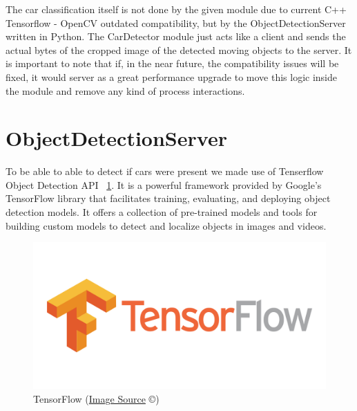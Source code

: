 \documentclass[17pt]{report}
\begin{document}
\indent \indent
The car classification itself is 
not done by the given module due to current C++ Tensorflow - OpenCV outdated compatibility,
but by the ObjectDetectionServer written in Python. The CarDetector module just acts 
like a client and sends the actual bytes of the cropped image of the detected moving objects 
to the server. It is important to note that if, in the near future, the compatibility issues
will be fixed, it would server as a great performance upgrade to move this logic
inside the module and remove any kind of process interactions.


\section{ObjectDetectionServer} 
\indent \indent
To be able to able to detect if cars were present we made use of Tenserflow 
Object Detection API ~\ref{fig:TensorFlow}. It is a powerful framework provided by Google's TensorFlow
library that facilitates training, evaluating, and deploying object detection
models. It offers a collection of pre-trained models and tools for building custom
models to detect and localize objects in images and videos. 

\begin{figure}[h!]
    \includegraphics[width=\textwidth]{TensorFlow.png}
    \caption{TensorFlow (\href{https://www.vectorlogo.zone/logos/tensorflow/index.html}{Image Source} \copyright)}
    \label{fig:TensorFlow}
\end{figure}
\end{document}
